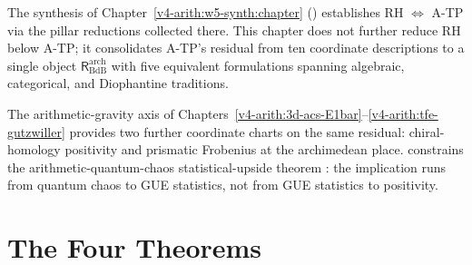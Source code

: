 The synthesis of Chapter~\ref{v4-arith:w5-synth:chapter}
() establishes
RH \(\Leftrightarrow\) A-TP via the pillar reductions collected there.
This chapter does not further reduce RH below A-TP; it consolidates
A-TP's residual from ten coordinate descriptions to a single object
\(\mathsf{R}^{\mathrm{arch}}_{\mathrm{BdB}}\) with five equivalent
formulations spanning algebraic, categorical, and Diophantine traditions.

The arithmetic-gravity axis of
Chapters~\ref{v4-arith:3d-acs-E1bar}--\ref{v4-arith:tfe-gutzwiller}
provides two further coordinate charts on the same residual:
chiral-homology positivity and prismatic Frobenius at the archimedean
place.  constrains the
arithmetic-quantum-chaos statistical-upside theorem
: the implication runs from
quantum chaos to GUE statistics, not from GUE statistics to positivity.

\section{The Four Theorems}
\label{v4-arith:w8-atp:summary}

